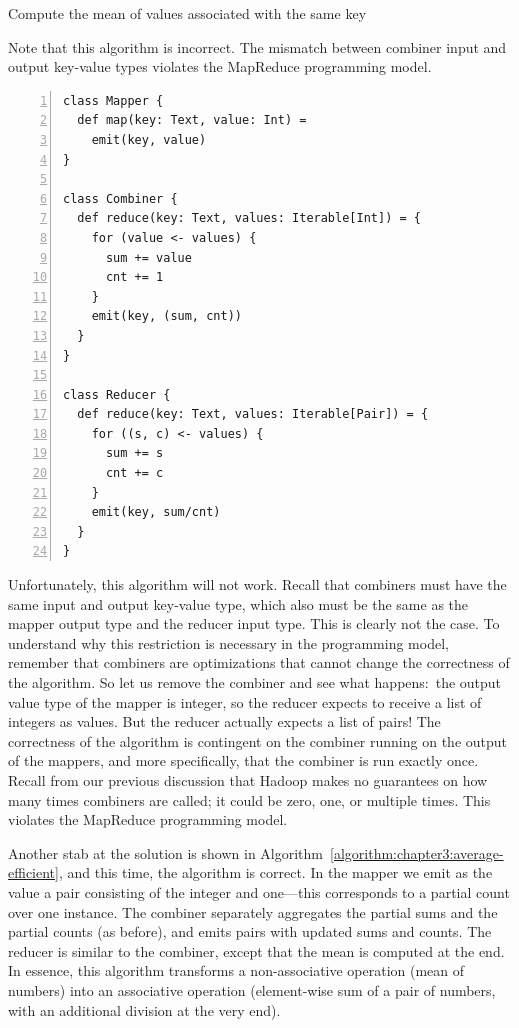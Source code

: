 \documentclass[11pt]{article}
\begin{document}
\begin{algorithm}[t]
\caption{Compute the mean of values associated with the same key}
\label{algorithm:chapter3:average-fail}
Note that this algorithm is incorrect. The mismatch between
combiner input and output key-value types violates the MapReduce
programming model.
\begin{small}
\begin{Verbatim}[numbers=left, xleftmargin=7.5mm]
class Mapper {
  def map(key: Text, value: Int) =
    emit(key, value)
}

class Combiner {
  def reduce(key: Text, values: Iterable[Int]) = {
    for (value <- values) {
      sum += value
      cnt += 1
    }
    emit(key, (sum, cnt))
  }
}

class Reducer {
  def reduce(key: Text, values: Iterable[Pair]) = {
    for ((s, c) <- values) {
      sum += s
      cnt += c
    }
    emit(key, sum/cnt)
  }
}
\end{Verbatim}
\end{small}
\end{algorithm}

Unfortunately, this algorithm will not work.  Recall that combiners
must have the same input and output key-value type, which also must be
the same as the mapper output type and the reducer input type.  This
is clearly not the case.  To understand why this restriction is
necessary in the programming model, remember that combiners are
optimizations that cannot change the correctness of the algorithm.  So
let us remove the combiner and see what happens:\ the output value
type of the mapper is integer, so the reducer expects to receive a
list of integers as values.  But the reducer actually expects a list
of pairs!  The correctness of the algorithm is contingent on the
combiner running on the output of the mappers, and more specifically,
that the combiner is run exactly once.  Recall from our previous
discussion that Hadoop makes no guarantees on how many times combiners
are called; it could be zero, one, or multiple times.  This violates
the MapReduce programming model.

Another stab at the solution is shown in
Algorithm~\ref{algorithm:chapter3:average-efficient}, and this time, the
algorithm is correct.  In the mapper we emit as the value a pair
consisting of the integer and one---this corresponds to a partial
count over one instance.  The combiner separately aggregates the
partial sums and the partial counts (as before), and emits pairs with
updated sums and counts.  The reducer is similar to the combiner,
except that the mean is computed at the end.  In essence, this
algorithm transforms a non-associative operation (mean of numbers)
into an associative operation (element-wise sum of a pair of numbers,
with an additional division at the very end).
\end{document}
